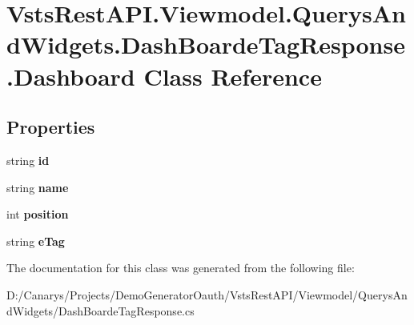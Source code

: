 \hypertarget{class_vsts_rest_a_p_i_1_1_viewmodel_1_1_querys_and_widgets_1_1_dash_boarde_tag_response_1_1_dashboard}{}\section{Vsts\+Rest\+A\+P\+I.\+Viewmodel.\+Querys\+And\+Widgets.\+Dash\+Boarde\+Tag\+Response.\+Dashboard Class Reference}
\label{class_vsts_rest_a_p_i_1_1_viewmodel_1_1_querys_and_widgets_1_1_dash_boarde_tag_response_1_1_dashboard}
\subsection*{Properties}
\begin{DoxyCompactItemize}
\item 
\mbox{\label{class_vsts_rest_a_p_i_1_1_viewmodel_1_1_querys_and_widgets_1_1_dash_boarde_tag_response_1_1_dashboard_af88d55e822bd728da88a8ae9cc312ec7}} 
string {\bfseries id}
\item 
\mbox{\label{class_vsts_rest_a_p_i_1_1_viewmodel_1_1_querys_and_widgets_1_1_dash_boarde_tag_response_1_1_dashboard_a0a3c816fde6a02f5ba000a593c089833}} 
string {\bfseries name}
\item 
\mbox{\label{class_vsts_rest_a_p_i_1_1_viewmodel_1_1_querys_and_widgets_1_1_dash_boarde_tag_response_1_1_dashboard_af3f903c668469de3677eec779bc56faa}} 
int {\bfseries position}
\item 
\mbox{\label{class_vsts_rest_a_p_i_1_1_viewmodel_1_1_querys_and_widgets_1_1_dash_boarde_tag_response_1_1_dashboard_ac2ea0442a11125cf4a57081573e4a514}} 
string {\bfseries e\+Tag}
\end{DoxyCompactItemize}


The documentation for this class was generated from the following file\+:\begin{DoxyCompactItemize}
\item 
D\+:/\+Canarys/\+Projects/\+Demo\+Generator\+Oauth/\+Vsts\+Rest\+A\+P\+I/\+Viewmodel/\+Querys\+And\+Widgets/Dash\+Boarde\+Tag\+Response.\+cs\end{DoxyCompactItemize}
